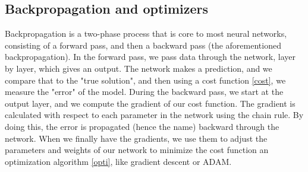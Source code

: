 \documentclass{article}
\begin{document}
\subsection{Backpropagation and optimizers}
Backpropagation is a two-phase process that is core to most neural networks, consisting of a forward pass, and then a backward pass (the aforementioned backpropagation). \newline
In the forward pass, we pass data through the network, layer by layer, which gives an output. The network makes a prediction, and we compare that to the "true solution", and then using a cost function \ref{cost}, we measure the "error" of the model.
\newline
During the backward pass, we start at the output layer, and we compute the gradient of our cost function. The gradient is calculated with respect to each parameter in the network using the chain rule. By doing this, the error is propagated (hence the name) backward through the network. When we finally have the gradients, we use them to adjust the parameters and weights of our network to minimize the cost function an optimization algorithm \ref{opti}, like gradient descent or ADAM.
\end{document}
